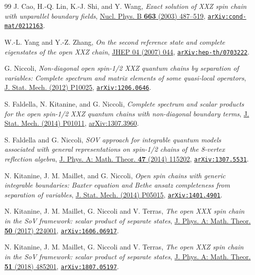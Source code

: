 \documentclass[a4paper,11pt]{article}
\numberwithin{equation}{section}
\begin{document}
\begin{thebibliography}{99}
J. Cao, H.-Q. Lin, K.-J. Shi, and Y. Wang,
\textit{Exact solution of XXZ spin chain with unparallel boundary ﬁelds},
\href{https://doi.org/10.1016/S0550-3213(03)00234-X}{Nucl. Phys. B \textbf{663} (2003) 487--519},
\href{https://arxiv.org/abs/cond-mat/0212163}{\tt arXiv:cond-mat/0212163}.

W.-L. Yang and Y.-Z. Zhang,
\textit{On the second reference state and complete eigenstates of the open XXZ chain},
\href{https://doi.org/10.1088/1126-6708/2007/04/044}{JHEP 04 (2007) 044},
\href{https://arxiv.org/abs/hep-th/0703222}{\tt arXiv:hep-th/0703222}.

G. Niccoli, 
\textit{Non-diagonal open spin-1/2 XXZ quantum chains by separation of
	variables: Complete spectrum and matrix elements of some quasi-local operators},
\href{https://doi.org/10.1088/1742-5468/2012/10/P10025}{J. Stat. Mech. (2012) P10025},
\href{https://arxiv.org/abs/1206.0646}{\tt arXiv:1206.0646}.

S. Faldella, N. Kitanine, and G. Niccoli,
\textit{Complete spectrum and scalar products
	for the open spin-1/2 XXZ quantum chains with non-diagonal boundary terms},
\href{https://doi.org/10.1088/1742-5468/2014/01/P01011}{J. Stat. Mech. (2014) P01011},
\href{https://arxiv.org/abs/1307.3960}{arXiv:1307.3960}.

S. Faldella and G. Niccoli,
\textit{SOV approach for integrable quantum models associated with general representations on spin-1/2 chains of the 8-vertex reﬂection algebra},
\href{https://doi.org/10.1088/1751-8113/47/11/115202}{J. Phys. A: Math. Theor. \textbf{47} (2014) 115202},
\href{https://arxiv.org/abs/1307.5531}{\tt arXiv:1307.5531}.

N. Kitanine, J. M. Maillet, and G. Niccoli,
\textit{Open spin chains with generic integrable boundaries: Baxter equation and Bethe ansatz completeness from separation of variables},
\href{https://doi.org/10.1088/1742-5468/2014/05/P05015}{J. Stat. Mech. (2014) P05015},
\href{https://arxiv.org/abs/1401.4901}{\tt arXiv:1401.4901}.

N. Kitanine, J. M. Maillet, G. Niccoli and V. Terras,
\textit{The open XXX spin chain in the SoV framework: scalar product of separate states},
\href{https://doi.org/10.1088/1751-8121/aa6cc9}{J. Phys. A: Math. Theor. \textbf{50} (2017) 224001},
\href{https://arxiv.org/abs/1606.06917}{\tt arXiv:1606.06917}.

N. Kitanine, J. M. Maillet, G. Niccoli and V. Terras,
\textit{The open XXZ spin chain in the SoV framework: scalar product of separate states},
\href{https://doi.org/10.1088/1751-8121/aad6e7}{J. Phys. A: Math. Theor. \textbf{51} (2018) 485201},
\href{https://arxiv.org/abs/1606.06917}{\tt	arXiv:1807.05197}.


\end{thebibliography}
\end{document}

